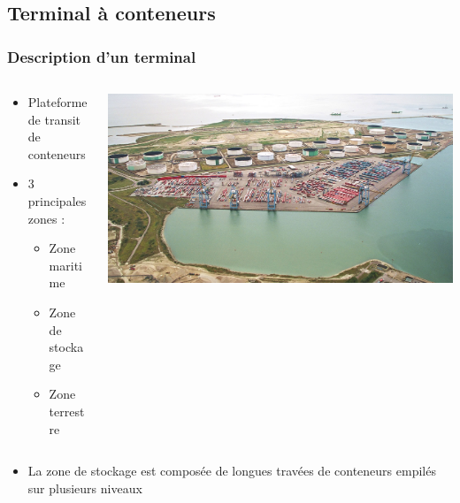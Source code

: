 \documentclass{beamer}
\begin{document}
\subsection*{Terminal à conteneurs}
\begin{frame}
\frametitle{Description d'un terminal}

 	\begin{columns}
 	 	\begin{column}[l]{4.5cm}
			\begin{itemize}
				\item Plateforme de transit de conteneurs
				\item 3 principales zones : 
				\begin{itemize}
 					\item Zone maritime
					\item Zone de stockage
					\item Zone terrestre
				\end{itemize}
			\end{itemize}
		\end{column}
 	 	\begin{column}[r]{7.5cm}
			\begin{flushright}
				\includegraphics[height=.55\textheight]{fig/terminalDeNormandie.jpg}
			\end{flushright}
		\end{column}
 	\end{columns}
\begin{itemize}
\item La zone de stockage est composée de longues travées de conteneurs empilés sur plusieurs niveaux
\end{itemize}
\end{frame}
\end{document}
